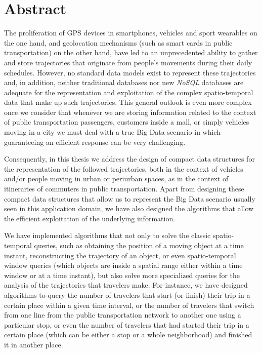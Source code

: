 
\chapter*{Abstract}

The proliferation of GPS devices in smartphones, vehicles and sport wearables on the one hand, and geolocation mechanisms (such as smart cards in public transportation) on the other hand, have led to an unprecedented ability to gather and store trajectories that originate from people's movements during their daily schedules. However, no standard data models exist to represent these trajectories and, in addition, neither traditional databases nor new \textit{NoSQL} databases are adequate for the representation and exploitation of the complex \mbox{spatio-temporal} data that make up such trajectories. This general outlook is even more complex once we consider that whenever we are storing information related to the context of public transportation passengers, customers inside a mall, or simply vehicles moving in a city we must deal with a true Big Data scenario in which guaranteeing an efficient response can be very challenging.

Consequently, in this thesis we address the design of compact data structures for the representation of the followed trajectories, both in the context of vehicles and/or people moving in urban or periurban spaces, as in the context of itineraries of commuters in public transportation. Apart from designing these compact data structures that allow us to represent the Big Data scenario usually seen in this application domain, we have also designed the algorithms that allow the efficient exploitation of the underlying information.

We have implemented algorithms that not only to solve the classic \mbox{spatio-temporal} queries, such as obtaining the position of a moving object at a time instant, reconstructing the trajectory of an object, or even \mbox{spatio-temporal} window queries (which objects are inside a spatial range either within a time window or at a time instant), but also solve more specialized queries for the analysis of the trajectories that travelers make. For instance, we have designed algorithms to query the number of travelers that start (or finish) their trip in a certain place within a given time interval, or the number of travelers that switch from one line from the public transportation network to another one using a particular stop, or even the number of travelers that had started their trip in a certain place (which can be either a stop or a whole neighborhood) and finished it in another place.

